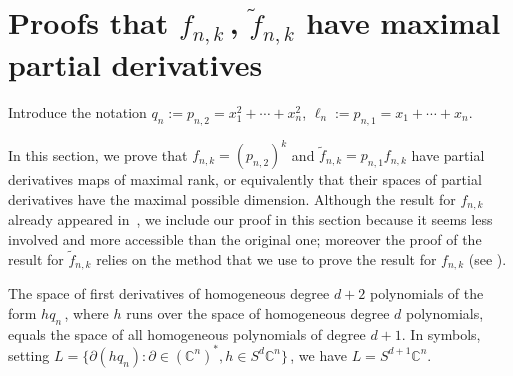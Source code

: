 \documentclass{toc}
\newcommand{\bbC}{\mathbb{C}}
\renewcommand{\tilde}[1]{\widetilde{#1}}
\begin{document}
\section{Proofs that \texorpdfstring{$f_{n,k}$\,, $\tilde f_{n,k}$}{f(n,k), tilde f(n,k)} have maximal partial derivatives}\label{easycataproofs}
Introduce the notation $q_n :=p_{n,2} =x_1^2+\cdots + x_n^2$, $\ell_n:= p_{n,1} = x_1 + \cdots + x_n$.

In this section, we prove that $f_{n,k}=(p_{n,2})^k$ and $\tilde{f}_{n,k}=p_{n,1}f_{n,k}$ have partial derivatives maps of maximal rank, or equivalently that their spaces of partial derivatives have the maximal possible dimension. Although the result for $f_{n,k}$ already appeared in~\cite[Thm. 8.15]{MR1096187}, we include our proof in this section because it seems less involved and more accessible than the original one; moreover the proof of the result for $\tilde{f}_{n,k}$ relies on the method that we use to prove the result for $f_{n,k}$ (see ).

 \begin{proposition}\label{prop: hit everything with deg one differentials}
The space of first  derivatives of homogeneous  degree $d+2$ polynomials of the form $h q_n$\,, where $h$ runs over the space of  homogeneous  degree $d$ polynomials,  equals the space of all homogeneous polynomials of degree $d+1$. In symbols, setting $L = \{ \partial ( h q_n  ) : \partial \in (\bbC^n)^*, h \in S^{d} \bbC^n\}$\,, we have $L = S^{d+1} \bbC^n$. 
\end{proposition}
\end{document}
